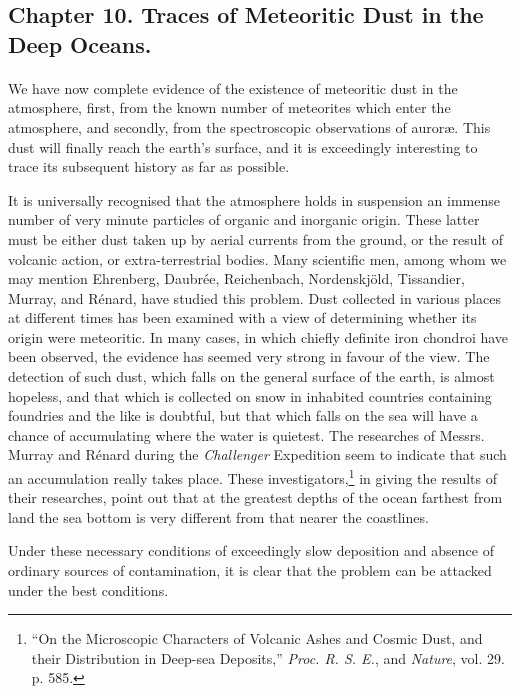 \documentclass[a4paper, 12pt, oneside, polutonikogreek, english]{article}
\begin{document}
\subsection{Chapter 10. Traces of Meteoritic Dust in the Deep Oceans.}
\paragraph{}
We have now complete evidence of the existence of meteoritic dust in the atmosphere, first, from the known number of meteorites which enter the atmosphere, and secondly, from the spectroscopic observations of auroræ. This dust will finally reach the earth's surface, and it is exceedingly interesting to trace its subsequent history as far as possible.

It is universally recognised that the atmosphere holds in suspension an immense number of very minute particles of organic and inorganic origin. These latter must be either dust taken up by aerial currents from the ground, or the result of volcanic action, or extra-terrestrial bodies. Many scientific men, among whom we may mention Ehrenberg, Daubrée, Reichenbach, Nordenskjöld, Tissandier, Murray, and Rénard, have studied this problem. Dust collected in various places at different times has been examined with a view of determining whether its origin were meteoritic. In many cases, in which chiefly definite iron chondroi have been observed, the evidence has seemed very strong in favour of the view. The detection of such dust, which falls on the general surface of the earth, is almost hopeless, and that which is collected on snow in inhabited countries containing foundries and the like is doubtful, but that which falls on the sea will have a chance of accumulating where the water is quietest. The researches of Messrs. Murray and Rénard during the \emph{Challenger} Expedition seem to indicate that such an accumulation really takes place. These investigators,\footnote{``On the Microscopic Characters of Volcanic Ashes and Cosmic Dust, and their Distribution in Deep-sea Deposits,'' \emph{Proc. R. S. E.}, and \emph{Nature}, vol. 29. p. 585.} in giving the results of their researches, point out that at the greatest depths of the ocean farthest from land the sea bottom is very different from that nearer the coastlines.

Under these necessary conditions of exceedingly slow deposition and absence of ordinary sources of contamination, it is clear that the problem can be attacked under the best conditions.
\end{document}
